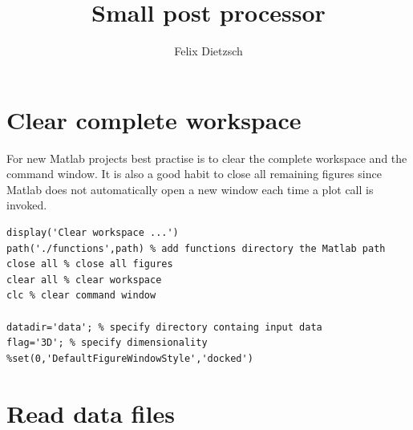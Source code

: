 \documentclass[preprint,12pt,ntfdMod]{elsarticle}
\author[rss]{Felix Dietzsch}
\title{Small post processor}
\begin{document}
		\maketitle 
		\tableofcontents

\section{Clear complete workspace}

\begin{par}
For new Matlab projects best practise is to clear the complete workspace and the command window. It is also a good habit to close all remaining figures since Matlab does not automatically open a new window each time a plot call is invoked.
\end{par} \vspace{1em}
\begin{verbatim}
display('Clear workspace ...')
path('./functions',path) % add functions directory the Matlab path
close all % close all figures
clear all % clear workspace
clc % clear command window

datadir='data'; % specify directory containg input data
flag='3D'; % specify dimensionality
%set(0,'DefaultFigureWindowStyle','docked')
\end{verbatim}


\section{Read data files}
\end{document}
